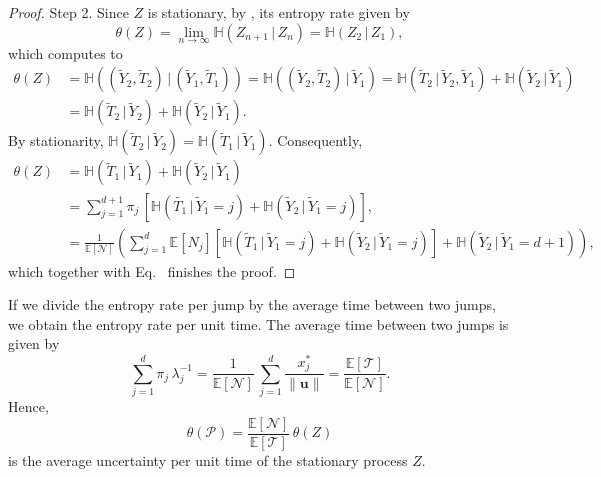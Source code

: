 \documentclass[smallextended]{svjour3}
\makeatletter
\renewcommand*{\eqref}[1]{%
  \hyperref[{#1}]{\textup{\tagform@{\ref*{#1}}}}%
}
\renewcommand{\vec}[1]{\mathbf{#1}}
\newcommand{\E}{\mathbb{E}}
\newcommand{\TT}{\mathcal{T}}
\renewcommand{\H}{\mathbb{H}}
\newcommand{\suml}{\sum\limits}
\newcommand{\liml}{\lim\limits}
\newcommand{\vnorms}[1]{\|#1\|}
\makeatother
\begin{document}
\begin{proof}
Step 2. Since $Z$ is stationary, by \citet[Theorem~4.2.1]{Cover2006}, its entropy rate given by
\begin{equation}
  \theta(Z) = \liml_{n\to\infty} \H(Z_{n+1}\,|\,Z_n) = \H(Z_2\,|\,Z_1),
\end{equation}
which computes to
\begin{equation}
 \begin{aligned}
   \theta(Z) 
   &= \H((\widetilde{Y}_2,\widetilde{T}_2)\,|\,(\widetilde{Y}_1,\widetilde{T}_1))
   = \H((\widetilde{Y}_2,\widetilde{T}_2)\,|\,\widetilde{Y}_1)
   = \H(\widetilde{T}_2\,|\,\widetilde{Y}_2,\widetilde{Y}_1) + \H(\widetilde{Y}_2\,|\,\widetilde{Y}_1)\\
   &= \H(\widetilde{T}_2\,|\,\widetilde{Y}_2) + \H(\widetilde{Y}_2\,|\,\widetilde{Y}_1).
 \end{aligned}
\end{equation}
By stationarity, $\H(\widetilde{T}_2\,|\,\widetilde{Y}_2) = \H(\widetilde{T}_1\,|\,\widetilde{Y}_1)$.
Consequently,
\begin{equation}
 \begin{aligned}
  \theta(Z)
  &= \H(\widetilde{T}_1\,|\,\widetilde{Y}_1) + \H(\widetilde{Y}_2\,|\,\widetilde{Y}_1)\\
  &= \suml_{j=1}^{d+1} \pi_j\,\left[\H(\widetilde{T_1}\,|\,\widetilde{Y}_1=j) + \H(\widetilde{Y}_2\,|\,\widetilde{Y}_1=j)\right],\\
  &= \frac{1}{\E\left[\mathcal{N}\right]} \left(\suml_{j=1}^d \E\left[N_j\right] \left[\H(\widetilde{T}_1\,|\,\widetilde{Y}_1=j) + \H(\widetilde{Y}_2\,|\,\widetilde{Y}_1=j)\right] + \H(\widetilde{Y}_2\,|\,\widetilde{Y}_1=d+1)\right),
 \end{aligned}
\end{equation}
which together with Eq.~\eqref{eqn:H_number_of_visits} finishes the proof.
\end{proof}
If we divide the entropy rate per jump by the average time between two jumps, we obtain the entropy rate per unit time.
The average time between two jumps is given by
\begin{equation}
  \suml_{j=1}^d\pi_j\,\lambda_j^{-1} = \frac{1}{\E\left[\mathcal{N}\right]}\,\suml_{j=1}^d \frac{x^\ast_j}{\vnorms{\vec{u}}} = \frac{\E\left[\TT\right]}{\E\left[\mathcal{N}\right]}.
\end{equation}
Hence,
\begin{equation}
  \theta(\mathcal{P}) = \frac{\E\left[\mathcal{N}\right]}{\E\left[\TT\right]}\,\theta(Z)
\end{equation}
is the average uncertainty per unit time of the stationary process $Z$.
\end{document}
